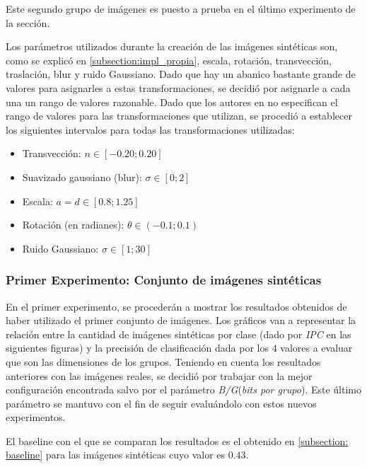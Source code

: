 	Este segundo grupo de imágenes es puesto a prueba en el último experimento de la sección.

	Los parámetros utilizados durante la creación de las imágenes sintéticas son, como se explicó en \ref{subsection:impl_propia}, escala, rotación, transvección, traslación, blur y ruido Gaussiano. Dado que hay un abanico bastante grande de valores para asignarles a estas transformaciones, se decidió por asignarle a cada una un rango de valores razonable. Dado que los autores en \cite{wang} no especifican el rango de valores para las transformaciones que utilizan, se procedió a establecer los siguientes intervalos para todas las transformaciones utilizadas:
	
	\begin{itemize}
		\item Transvección: $n \in [-0.20 ; 0.20]$
		\item Suavizado gaussiano (blur): $\sigma \in [0 ; 2]$
		\item Escala: $a=d \in [0.8; 1.25]$
		\item Rotación (en radianes): $\theta \in (-0.1; 0.1)$
		\item Ruido Gaussiano: $\sigma \in [1; 30]$
	\end{itemize}

\subsubsection{Primer Experimento: Conjunto de imágenes sintéticas}
\label{subsubsection:primer-experimento}

	En el primer experimento, se procederán a mostrar los resultados obtenidos de haber utilizado el primer conjunto de imágenes. Los gráficos van a representar la relación entre la cantidad de imágenes sintéticas por clase (dado por \textit{IPC} en las siguientes figuras) y la precisión de clasificación dada por los $4$ valores a evaluar que son las dimensiones de los grupos. Teniendo en cuenta los resultados anteriores con las imágenes reales, se decidió por trabajar con la mejor configuración encontrada salvo por el parámetro \textit{B/G}(\textit{bits por grupo}). Este último parámetro se mantuvo con el fin de seguir evaluándolo con estos nuevos experimentos.
	
	El baseline con el que se comparan los resultados es el obtenido en \ref{subsection: baseline} para las imágenes sintéticas cuyo valor es $0.43$.

